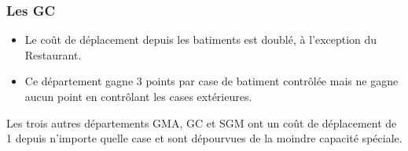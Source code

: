 \subsubsection{Les GC}
\begin{itemize}
\item Le coût de déplacement depuis les batiments est doublé, à l'exception du Restaurant. 
\item Ce département gagne 3 points par case de batiment contrôlée mais ne gagne aucun point en contrôlant les cases extérieures. 
\end{itemize}

Les trois autres départements GMA, GC et SGM ont un coût de déplacement de 1 depuis n'importe quelle case et sont dépourvues de la moindre capacité spéciale.